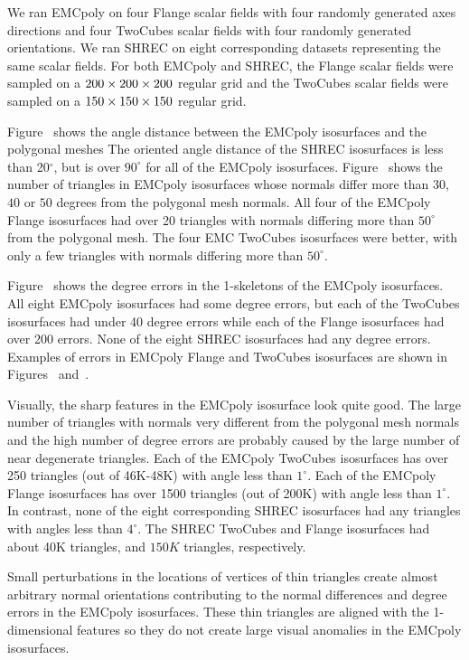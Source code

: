 We ran EMCpoly on four Flange scalar fields 
with four randomly generated axes directions
and four TwoCubes scalar fields with four randomly generated orientations.
We ran SHREC on eight corresponding datasets representing 
the same scalar fields.
For both EMCpoly and SHREC,
the Flange scalar fields were sampled on a $200 \times 200 \times 200$ regular grid
and the TwoCubes scalar fields were sampled on a $150 \times 150 \times 150$ regular grid.

Figure~\protect{} shows the angle distance
between the EMCpoly isosurfaces and the polygonal meshes
The oriented angle distance of the SHREC isosurfaces is less than 20$^\circ$,
but is over $90^\circ$ for all of the EMCpoly isosurfaces.
Figure~\protect{} shows the
number of triangles in EMCpoly isosurfaces 
whose normals differ more than $30$, $40$ or $50$ degrees
from the polygonal mesh normals.
All four of the EMCpoly Flange isosurfaces had over 20 triangles
with normals differing more than $50^\circ$ from the polygonal mesh.
The four EMC TwoCubes isosurfaces were better,
with only a few triangles with normals differing more than $50^\circ$.

Figure~\protect{} shows the degree errors
in the 1-skeletons of the \mbox{EMCpoly} isosurfaces.
All eight EMCpoly isosurfaces had some degree errors,
but each of the TwoCubes isosurfaces had under 40 degree errors
while each of the Flange isosurfaces had over 200 errors.
None of the eight SHREC isosurfaces had any degree errors.
Examples of errors in EMCpoly Flange and TwoCubes isosurfaces
are shown in Figures~ 
and~.

Visually, the sharp features in the EMCpoly isosurface look quite good.
The large number of triangles with normals very different from the polygonal
mesh normals and the high number of degree errors
are probably caused by the large number of near degenerate triangles.
Each of the EMCpoly TwoCubes isosurfaces has over 250 triangles
(out of 46K-48K)
with angle less than $1^\circ$.
Each of the EMCpoly Flange isosurfaces has over 1500 triangles
(out of 200K)
with angle less than $1^\circ$.
In contrast, none of the eight corresponding SHREC isosurfaces
had any triangles with angles less than $4^\circ$.
The SHREC TwoCubes and Flange isosurfaces had about 40K triangles,
and $150K$ triangles, respectively.

Small perturbations in the locations of vertices 
of thin triangles
create almost arbitrary normal orientations
contributing to the normal differences and degree errors
in the EMCpoly isosurfaces.
These thin triangles are aligned with the 1-dimensional features
so they do not create large visual anomalies in the EMCpoly isosurfaces.

